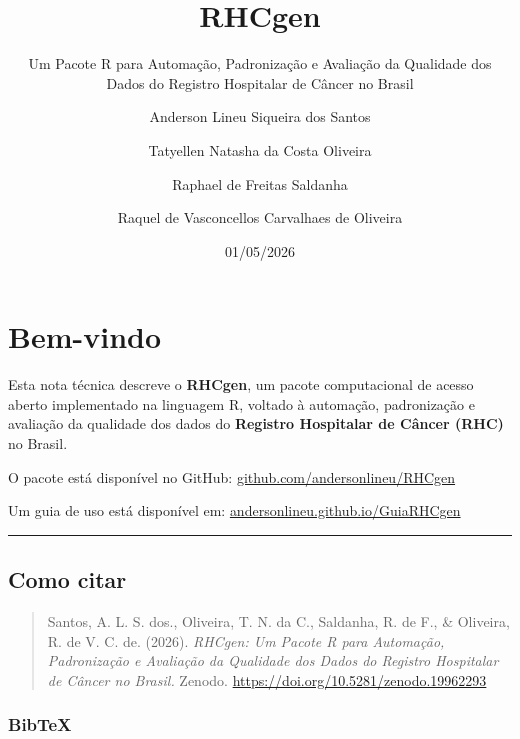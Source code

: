\documentclass[
  brazilian,
  a4paper,
  oneside]{scrbook}
\title{RHCgen}
\subtitle{Um Pacote R para Automação, Padronização e Avaliação da
Qualidade dos Dados do Registro Hospitalar de Câncer no Brasil}
\author{Anderson Lineu Siqueira dos Santos \and Tatyellen Natasha da
Costa Oliveira \and Raphael de Freitas Saldanha \and Raquel de
Vasconcellos Carvalhaes de Oliveira}
\date{01/05/2026}
\renewcommand*\contentsname{Índice}
\newcommand\contentsname{Índice}
\begin{document}
\frontmatter
\maketitle

\renewcommand*\contentsname{Índice}
{
\setcounter{tocdepth}{2}
\tableofcontents
}

\mainmatter
{}

\chapter*{Bem-vindo}\label{bem-vindo}


Esta nota técnica descreve o \textbf{RHCgen}, um pacote computacional de
acesso aberto implementado na linguagem R, voltado à automação,
padronização e avaliação da qualidade dos dados do \textbf{Registro
Hospitalar de Câncer (RHC)} no Brasil.

O pacote está disponível no GitHub:
\href{https://github.com/andersonlineu/RHCgen}{github.com/andersonlineu/RHCgen}

Um guia de uso está disponível em:
\href{https://andersonlineu.github.io/GuiaRHCgen/}{andersonlineu.github.io/GuiaRHCgen}

\begin{center}\rule{0.5\linewidth}{0.5pt}\end{center}

\section*{Como citar}\label{como-citar}


\begin{quote}
Santos, A. L. S. dos., Oliveira, T. N. da C., Saldanha, R. de F., \&
Oliveira, R. de V. C. de. (2026). \emph{RHCgen: Um Pacote R para
Automação, Padronização e Avaliação da Qualidade dos Dados do Registro
Hospitalar de Câncer no Brasil.} Zenodo.
\url{https://doi.org/10.5281/zenodo.19962293}
\end{quote}

\subsection*{BibTeX}\label{bibtex}
\end{document}
